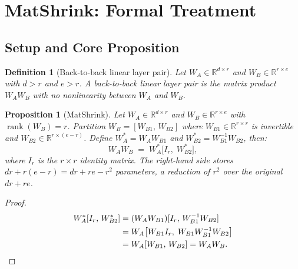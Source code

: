 \documentclass{article}
\newtheorem{proposition}[theorem]{Proposition}
\newtheorem{definition}[theorem]{Definition}
\DeclareMathOperator{\rank}{rank}
\begin{document}

\section{MatShrink: Formal Treatment} \label{sec:method}

\subsection{Setup and Core Proposition}

\begin{definition}[Back-to-back linear layer pair]
\label{def:b2b}
Let $W_A \in \mathbb{R}^{d \times r}$ and $W_B \in \mathbb{R}^{r \times e}$ with $d > r$ and $e > r$. A \emph{back-to-back linear layer pair} is the matrix product $W_A W_B$ with no nonlinearity between $W_A$ and $W_B$.
\end{definition}

\begin{proposition}[MatShrink]
\label{prop:matshrink}
Let $W_A \in \mathbb{R}^{d \times r}$ and $W_B \in \mathbb{R}^{r \times e}$ with $\rank(W_B) = r$. Partition $W_B = [W_{B1},\, W_{B2}]$ where $W_{B1} \in \mathbb{R}^{r \times r}$ is invertible and $W_{B2} \in \mathbb{R}^{r \times (e-r)}$. Define
$ W_A^* = W_A W_{B1}$ and $W_{B2}^* = W_{B1}^{-1} W_{B2}$, then:
\begin{equation}
  W_A W_B \;=\; W_A^* \bigl[I_r,\; W_{B2}^*\bigr],
  \label{eq:matshrink}
\end{equation}
where $I_r$ is the $r \times r$ identity matrix. The right-hand side stores $dr + r(e-r) = dr + re - r^2$ parameters, a reduction of $r^2$ over the original $dr + re$.
\end{proposition}

\begin{proof}
\begin{align*}
  W_A^* [I_r,\, W_{B2}^*]
  &= (W_A W_{B1}) [I_r,\, W_{B1}^{-1} W_{B2}] \\
  &= W_A \bigl[W_{B1} I_r,\; W_{B1} W_{B1}^{-1} W_{B2}\bigr] \\
  &= W_A [W_{B1},\, W_{B2}] = W_A W_B. \qedhere
\end{align*}
\end{proof}
\end{document}
